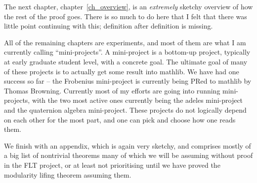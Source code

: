 The next chapter, chapter~\ref{ch_overview}, is an \emph{extremely} sketchy overview of how
the rest of the proof goes. There is so much to do here that I felt that there was little
point continuing with this; definition after definition is missing.

All of the remaining chapters are experiments, and most of them are what I am currently
calling ``mini-projects''. A mini-project is a bottom-up project, typically at early graduate
student level, with a concrete goal. The ultimate goal of many of these projects is to actually
get some result into mathlib. We have had one success so far -- the Frobenius mini-project
is currently being PRed to mathlib by Thomas Browning. Currently most of my efforts are
going into running mini-projects, with the two most active ones currently being the adeles
mini-project and the quaternion algebra mini-project. These projects do not logically depend
on each other for the most part, and one can pick and choose how one reads them.

We finish with an appendix, which is again very sketchy, and comprises mostly of a big
list of nontrivial theorems many of which we will be assuming without proof in the FLT
project, or at least not prioritising until we have proved the modularity lifing
theorem assuming them.
